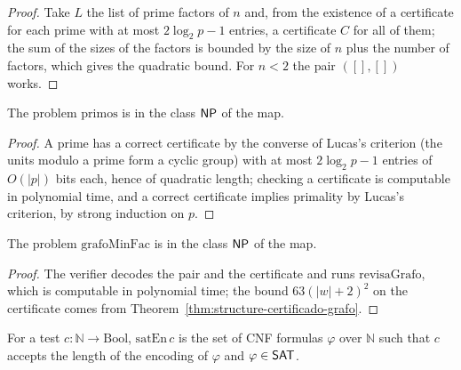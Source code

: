 \begin{proof}
  \leanok
  Take $L$ the list of prime factors of $n$ and, from the existence of a certificate for each
  prime with at most $2\log_2 p - 1$ entries, a certificate $C$ for all of them; the sum of the
  sizes of the factors is bounded by the size of $n$ plus the number of factors, which gives the
  quadratic bound. For $n < 2$ the pair $([], [])$ works.
\end{proof}

\begin{theorem}
  \label{thm:structure-primos-np}
  \leanok
  The problem $\mathrm{primos}$ is in the class $\mathsf{NP}$ of the map.
\end{theorem}

\begin{proof}
  \leanok
  A prime has a correct certificate by the converse of Lucas's criterion (the units modulo a
  prime form a cyclic group) with at most $2\log_2 p - 1$ entries of $O(|p|)$ bits each, hence of
  quadratic length; checking a certificate is computable in polynomial time, and a correct
  certificate implies primality by Lucas's criterion, by strong induction on $p$.
\end{proof}

\begin{theorem}
  \label{thm:structure-grafo-minfac-np}
  \leanok
  The problem $\mathrm{grafoMinFac}$ is in the class $\mathsf{NP}$ of the map.
  \own{}
\end{theorem}

\begin{proof}
  \leanok
  The verifier decodes the pair and the certificate and runs $\mathrm{revisaGrafo}$, which is
  computable in polynomial time; the bound $63(|w|+2)^2$ on the certificate comes from
  Theorem~\ref{thm:structure-certificado-grafo}.
\end{proof}

\begin{definition}
  \label{def:structure-sat-en}
  \leanok
  For a test $c : \mathbb{N} \to \mathrm{Bool}$, $\mathrm{satEn}\,c$ is the set of CNF formulas
  $\varphi$ over $\mathbb{N}$ such that $c$ accepts the length of the encoding of $\varphi$ and
  $\varphi \in \mathsf{SAT}$.
  \own{}
\end{definition}

